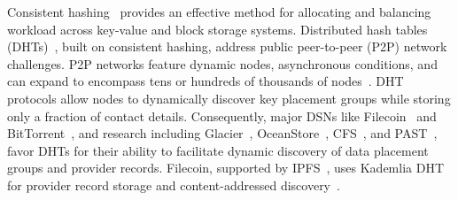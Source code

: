 
Consistent hashing~\cite{chash} provides an effective method for allocating and balancing workload across key-value and block storage systems.
Distributed hash tables (DHTs)~\cite{maymounkov2002kademlia,chord,rowstron2001pastry}, built on consistent hashing, address public peer-to-peer (P2P) network challenges.
P2P networks feature dynamic nodes, asynchronous conditions, and can expand to encompass tens or hundreds of thousands of nodes~\cite{trautwein2022design}.
DHT protocols allow nodes to dynamically discover key placement groups while storing only a fraction of contact details.
Consequently, major DSNs like Filecoin~\cite{filecoin} and BitTorrent~\cite{wang2013measuring,xinxing2016measurement}, and research including Glacier~\cite{haeberlen2005glacier}, OceanStore~\cite{kubiatowicz2000oceanstore}, CFS~\cite{dabek2001wide}, and PAST~\cite{druschel2001past}, favor DHTs for their ability to facilitate dynamic discovery of data placement groups and provider records.
Filecoin, supported by IPFS~\cite{benet2014ipfs,trautwein2022design}, uses Kademlia DHT for provider record storage and content-addressed discovery~\cite{ratnasamy2001scalable}.


